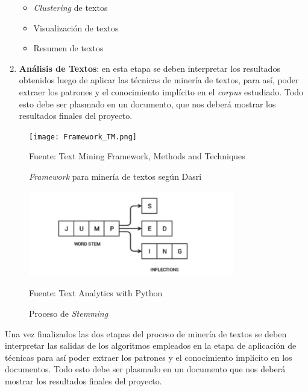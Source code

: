 \begin{enumerate}
\begin{itemize}
            \item \textit{Clustering} de textos
            \item Visualización de textos
            \item Resumen de textos
        \end{itemize}
    \item \textbf{Análisis de Textos}: en esta etapa se deben interpretar los resultados obtenidos luego de aplicar las técnicas de minería de textos, para así, poder extraer los patrones y el conocimiento implícito en el \textit{corpus} estudiado. Todo esto debe ser plasmado en un documento, que nos deberá mostrar los resultados finales del proyecto.
    \end{enumerate}
\begin{figure}[H]
    \centering
    \texttt{[image: Framework\_TM.png]}
    \caption{\label{fig:Framework_TM} \textit{Framework} para minería de textos según Dasri} Fuente: Text Mining Framework, Methods and Techniques \cite{dasritext}
\end{figure}

\begin{figure}[H]
    \centering
    \includegraphics[width=0.8\textwidth]{figures/Stemming.png}
    \caption{\label{fig:Stemming} Proceso de \textit{Stemming}} Fuente: Text Analytics with Python \cite{sarkar2016text}
\end{figure}

    Una vez finalizados las dos etapas del proceso de minería de textos se deben interpretar las salidas de los algoritmos empleados en la etapa de aplicación de técnicas para así poder extraer los patrones y el conocimiento implícito en los documentos. Todo esto debe ser plasmado en un documento que nos deberá mostrar los resultados finales del proyecto.
    
